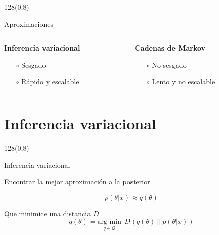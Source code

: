 \documentclass[shownotes]{beamer}
\begin{document}
\begin{frame}
\begin{textblock}{128}(0,8)
\begin{center}
 \large Aproximaciones
\end{center}
\end{textblock}


\begin{columns}[t]
\begin{column}{0.5\textwidth}
 \centering \textbf{Inferencia variacional}
 
\begin{itemize}
  \item[$\circ$] Sesgado
  \item[$\circ$] R\'apido y escalable
 \end{itemize}

 
 \end{column}
 \begin{column}{0.5\textwidth}
\centering  \textbf{Cadenas de Markov}

\begin{itemize}
  \item[$\circ$] No sesgado
  \item[$\circ$] Lento y no escalable
 \end{itemize}

\end{column}
\end{columns}


\end{frame}
 
\section{Inferencia variacional}

\begin{frame}
\begin{textblock}{128}(0,8)
\begin{center}
 \large Inferencia variacional
\end{center}
\end{textblock}

Encontrar la mejor aproximaci\'on a la posterior

\begin{equation*}
 p(\theta|x) \approx q(\theta)
\end{equation*}

\vspace{0.3cm}
Que minimice una distancia $D$
\begin{equation*}
 q(\theta) = \underset{q \in \mathcal{Q}}{\text{arg min}} \ \ D(q(\theta) \ || \ p(\theta|x))
\end{equation*}
\end{frame}
 
\end{document}

